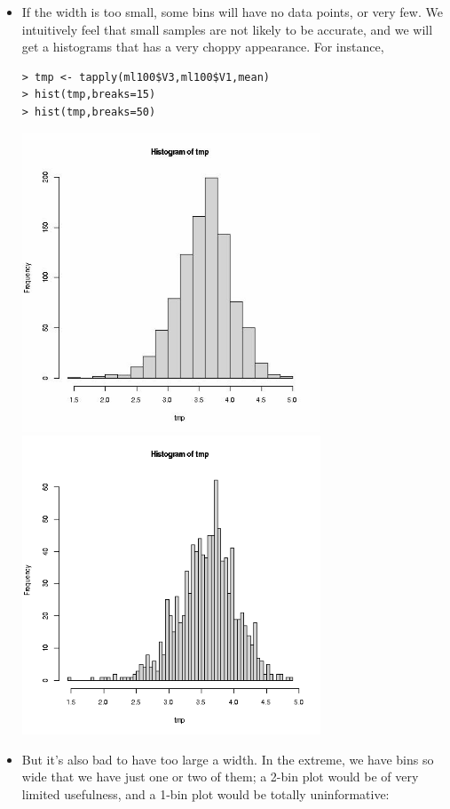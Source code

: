 \begin{itemize}

\item If the width is too small, some bins will have no data points, or
very few.  We intuitively feel that small samples are not likely to be
accurate, and we will get a histograms that has a very choppy appearance.
For instance, 

\begin{lstlisting}
> tmp <- tapply(ml100$V3,ml100$V1,mean)
> hist(tmp,breaks=15)
> hist(tmp,breaks=50)
\end{lstlisting}

\includegraphics[width=3.5in]{Images/HistBrks15.png} 
\includegraphics[width=3.5in]{Images/HistBrks50.png} 

\item But it's also bad to have too large a width.  In the extreme, we
have bins so wide that we have just one or two of them; a 2-bin plot
would be of very limited usefulness, and a 1-bin plot would be
totally uninformative:


\end{itemize}
